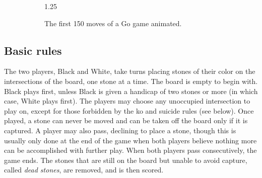 \begin{figure}[h!t]
\begin{subfigure}[ht]{0.46\textwidth}
{\begin{animateinline}[controls,buttonbg=0.95,buttonsize=4em,poster=last,autopause,timeline=Animation_Go_Game.txt,begin={\begin{tikzpicture}\useasboundingbox (-1,-1) rectangle (19,19);},end={\end{tikzpicture}}]{1.25}
		\newframe {}
		\newframe {}
		\newframe {}
		\newframe {}
		\newframe {}
		\newframe {}
		\newframe {}
		\newframe {}
		\newframe {}
		\newframe {}
		\newframe {}
		\newframe {}
		\newframe {}
		\newframe {}
		\newframe {}
		\newframe {}
		\newframe {}
		\newframe {}
		\newframe {}
	\end{animateinline}}
	\caption{The first 150 moves of a Go game animated.}\label{Go_Simulation}
\end{subfigure}
\caption{}\label{Go}
\end{figure}
\subsection{Basic rules}
The two players, Black and White, take turns placing stones of their color on the intersections of the board, one stone at a time. The board is empty to begin with. Black plays first, unless Black is given a handicap of two stones or more (in which case, White plays first). The players may choose any unoccupied intersection to play on, except for those forbidden by the ko and suicide rules (see below). Once played, a stone can never be moved and can be taken off the board only if it is captured. A player may also pass, declining to place a stone, though this is usually only done at the end of the game when both players believe nothing more can be accomplished with further play. When both players pass consecutively, the game ends. The stones that are still on the board but unable to avoid capture, called \emph{dead stones}, are removed, and is then scored.

